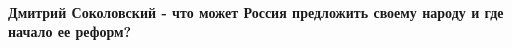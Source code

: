  
 
 
 
 
\paragraph{Дмитрий Соколовский - что может Россия предложить своему народу и где начало ее реформ?}
\label{sec:03_10_2021.fb.zaharova_maria.mid_rf.1.zelenskii_politika_naglost.cmt.4.sokolovskij_rossia}

